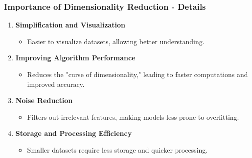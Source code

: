 \documentclass[aspectratio=169]{beamer}
\begin{document}
\begin{frame}[fragile]
    \frametitle{Importance of Dimensionality Reduction - Details}
    \begin{enumerate}
        \item \textbf{Simplification and Visualization}
            \begin{itemize}
                \item Easier to visualize datasets, allowing better understanding.
            \end{itemize}
    
        \item \textbf{Improving Algorithm Performance}
            \begin{itemize}
                \item Reduces the "curse of dimensionality," leading to faster computations and improved accuracy.
            \end{itemize}

        \item \textbf{Noise Reduction}
            \begin{itemize}
                \item Filters out irrelevant features, making models less prone to overfitting.
            \end{itemize}

        \item \textbf{Storage and Processing Efficiency}
            \begin{itemize}
                \item Smaller datasets require less storage and quicker processing.
            \end{itemize}
    \end{enumerate}
\end{frame}
\end{document}
